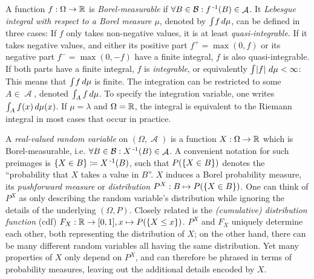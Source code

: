 \documentclass[a4paper]{scrreprt}
\DeclareMathOperator{\A}{\mathcal{A}}
\newcommand{\B}{\mathcal{B}}
\begin{document}
    A function $f: \Omega \to \mathbb{R}$ is \emph{Borel-measurable} if $\forall B \in \B: f\inv(B) \in \A$.
    It \emph{Lebesgue integral with respect to a Borel measure $\mu$}, denoted by $\int_{} f \, d\mu$, can be defined in three cases:
    If $f$ only takes non-negative values, it is at least \emph{quasi-integrable}. If it takes negative values, and either its positive part $f^+ = \max(0, f)$ or its negative part $f^- = \max(0, -f)$ have a finite integral, $f$ is also quasi-integrable.
    If both parts have a finite integral, $f$ is \emph{integrable}, or equivalently $\int_{} \left| f \right| \, d\mu < \infty$: This means that $\int_{} f \, d\mu$ is finite.
    The integration can be restricted to some $A \in \A$, denoted $\int_{A} f \, d\mu$. To specify the integration variable, one writes $\int_{A} f(x) \, d\mu(x)$.
    If $\mu = \lambda$ and $\Omega = \mathbb{R}$, the integral is equivalent to the Riemann integral in most cases that occur in practice.
    
    
    A \emph{real-valued random variable} on $(\Omega, \A)$ is a function $X: \Omega \to \mathbb{R}$ which is Borel-measurable, i.e. $\forall B \in \B: X\inv(B) \in \A$. 
    A convenient notation for such preimages is $\{X \in B\} \coloneqq X\operatorname{^{-1}}(B)$, such that $P(\{X \in B\})$ denotes the “probability that $X$ takes a value in $B$”.
    $X$ induces a Borel probability measure, its \emph{pushforward measure} or \emph{distribution} $P^X: B \mapsto P(\{X \in B\})$. One can think of $P^X$ as only describing the random variable's distribution while ignoring the details of the underlying $(\Omega, P)$.
    Closely related is the \emph{(cumulative) distribution function} (cdf) $F_X: \mathbb{R} \to [0, 1], x \mapsto P(\{X \leq x\})$.
    $P^X$ and $F_X$ uniquely determine each other, both representing the distribution of $X$; on the other hand, there can be many different random variables all having the same distribution.
    Yet many properties of $X$ only depend on $P^X$, and can therefore be phrased in terms of probability measures, leaving out the additional details encoded by $X$.
    
\end{document}
